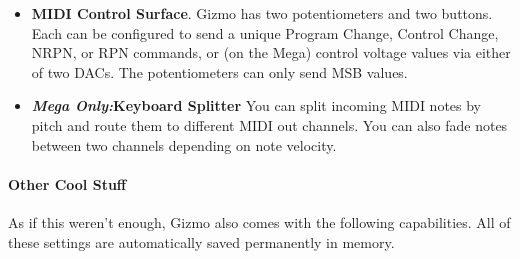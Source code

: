 \documentclass{article}
\begin{document}
\begin{itemize}
\item {\bf MIDI Control Surface}.  Gizmo has two potentiometers and two buttons.  Each can be configured to send a unique Program Change, Control Change, NRPN, or RPN commands, or (on the Mega) control voltage values via either of two DACs.  The potentiometers can only send MSB values.

\item {\bf \textit{Mega Only:}\quad Keyboard Splitter}  You can split incoming MIDI notes by pitch and route them to different MIDI out channels.  You can also fade notes between two channels depending on note velocity.
\end{itemize}

\paragraph{Other Cool Stuff}

As if this weren't enough, Gizmo also comes with the following capabilities.  All of these settings are automatically saved permanently in memory.
\end{document}
